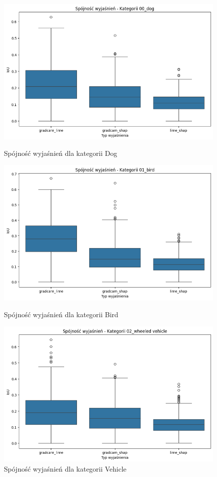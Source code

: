\begin{figure}
	\centering
	\begin{minipage}[b]{0.3\textwidth}
		\includegraphics[width=.9\textwidth]{img/base_coherence_dog}
		\caption{Spójność wyjaśnień dla kategorii Dog}  \label{}
	\end{minipage}
	\begin{minipage}[b]{0.3\textwidth}
		\centering\includegraphics[width=.9\textwidth]{img/base_coherence_bird}
		\caption{Spójność wyjaśnień dla kategorii Bird}  \label{}
	\end{minipage}
	\begin{minipage}[b]{0.3\textwidth}
		\centering\includegraphics[width=.9\textwidth]{img/base_coherence_vehicle}
		\caption{Spójność wyjaśnień dla kategorii Vehicle}  \label{}
	\end{minipage}
\end{figure}
